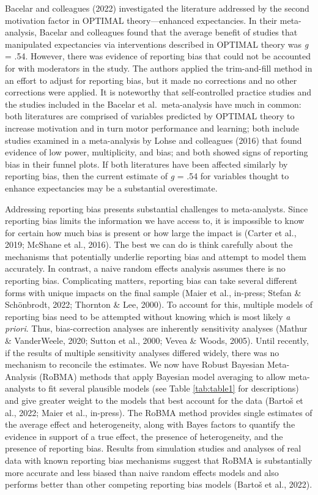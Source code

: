 \documentclass[
  man, donotrepeattitle,floatsintext]{apa7}
\begin{document}
Bacelar and colleagues (2022) investigated the literature addressed by the second motivation factor in OPTIMAL theory---enhanced expectancies. In their meta-analysis, Bacelar and colleagues found that the average benefit of studies that manipulated expectancies via interventions described in OPTIMAL theory was \emph{g} = .54. However, there was evidence of reporting bias that could not be accounted for with moderators in the study. The authors applied the trim-and-fill method in an effort to adjust for reporting bias, but it made no corrections and no other corrections were applied. It is noteworthy that self-controlled practice studies and the studies included in the Bacelar et al.~meta-analysis have much in common: both literatures are comprised of variables predicted by OPTIMAL theory to increase motivation and in turn motor performance and learning; both include studies examined in a meta-analysis by Lohse and colleagues (2016) that found evidence of low power, multiplicity, and bias; and both showed signs of reporting bias in their funnel plots. If both literatures have been affected similarly by reporting bias, then the current estimate of \emph{g} = .54 for variables thought to enhance expectancies may be a substantial overestimate.

Addressing reporting bias presents substantial challenges to meta-analysts. Since reporting bias limits the information we have access to, it is impossible to know for certain how much bias is present or how large the impact is (Carter et al., 2019; McShane et al., 2016). The best we can do is think carefully about the mechanisms that potentially underlie reporting bias and attempt to model them accurately. In contrast, a naive random effects analysis assumes there is no reporting bias. Complicating matters, reporting bias can take several different forms with unique impacts on the final sample (Maier et al., in-press; Stefan \& Schönbrodt, 2022; Thornton \& Lee, 2000). To account for this, multiple models of reporting bias need to be attempted without knowing which is most likely \emph{a priori}. Thus, bias-correction analyses are inherently sensitivity analyses (Mathur \& VanderWeele, 2020; Sutton et al., 2000; Vevea \& Woods, 2005). Until recently, if the results of multiple sensitivity analyses differed widely, there was no mechanism to reconcile the estimates. We now have Robust Bayesian Meta-Analysis (RoBMA) methods that apply Bayesian model averaging to allow meta-analysts to fit several plausible models (see Table \ref{tab:table1} for descriptions) and give greater weight to the models that best account for the data (Bartoš et al., 2022; Maier et al., in-press). The RoBMA method provides single estimates of the average effect and heterogeneity, along with Bayes factors to quantify the evidence in support of a true effect, the presence of heterogeneity, and the presence of reporting bias. Results from simulation studies and analyses of real data with known reporting bias mechanisms suggest that RoBMA is substantially more accurate and less biased than naive random effects models and also performs better than other competing reporting bias models (Bartoš et al., 2022).
\end{document}
